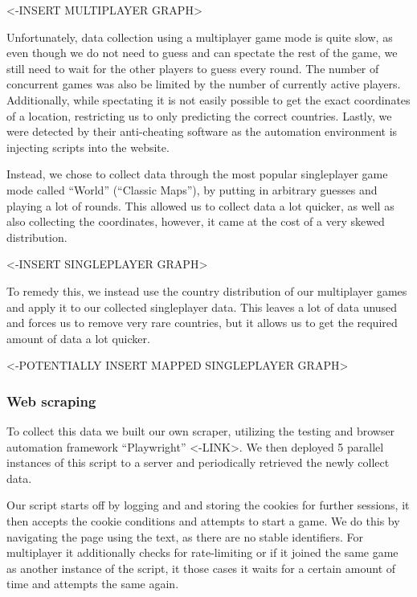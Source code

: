 \textless-INSERT MULTIPLAYER GRAPH\textgreater{}

Unfortunately, data collection using a multiplayer game mode is quite
slow, as even though we do not need to guess and can spectate the rest
of the game, we still need to wait for the other players to guess every
round. The number of concurrent games was also be limited by the number
of currently active players. Additionally, while spectating it is not
easily possible to get the exact coordinates of a location, restricting
us to only predicting the correct countries. Lastly, we were detected by
their anti-cheating software as the automation environment is injecting
scripts into the website.

Instead, we chose to collect data through the most popular singleplayer
game mode called ``World'' (``Classic Maps''), by putting in arbitrary
guesses and playing a lot of rounds. This allowed us to collect data a
lot quicker, as well as also collecting the coordinates, however, it
came at the cost of a very skewed distribution.

\textless-INSERT SINGLEPLAYER GRAPH\textgreater{}

To remedy this, we instead use the country distribution of our
multiplayer games and apply it to our collected singleplayer data. This
leaves a lot of data unused and forces us to remove very rare countries,
but it allows us to get the required amount of data a lot quicker.

\textless-POTENTIALLY INSERT MAPPED SINGLEPLAYER GRAPH\textgreater{}

\subsubsection{Web scraping}\label{web-scraping}

To collect this data we built our own scraper, utilizing the testing and
browser automation framework ``Playwright'' \textless-LINK\textgreater.
We then deployed 5 parallel instances of this script to a server and
periodically retrieved the newly collect data.

Our script starts off by logging and and storing the cookies for further
sessions, it then accepts the cookie conditions and attempts to start a
game. We do this by navigating the page using the text, as there are no
stable identifiers. For multiplayer it additionally checks for
rate-limiting or if it joined the same game as another instance of the
script, it those cases it waits for a certain amount of time and
attempts the same again.

